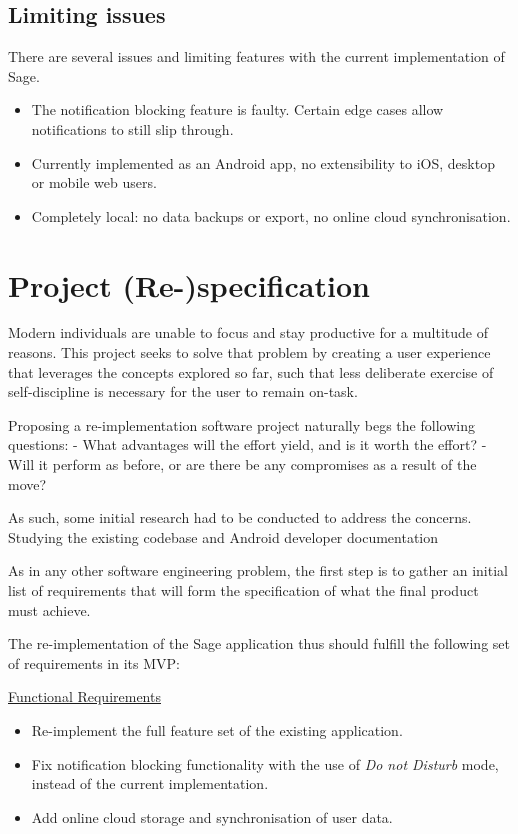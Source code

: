 \subsection{Limiting issues}
There are several issues and limiting features with the current implementation of Sage.

\begin{itemize}
    \item The notification blocking feature is faulty. Certain edge cases allow notifications to still slip through.
    \item Currently implemented as an Android app, no extensibility to iOS, desktop or mobile web users.
    \item Completely local: no data backups or export, no online cloud synchronisation.
\end{itemize}





\section{Project (Re-)specification}
Modern individuals are unable to focus and stay productive for a multitude of reasons. This project seeks to solve that problem by creating a user experience that leverages the concepts explored so far, such that less deliberate exercise of self-discipline is necessary for the user to remain on-task.

Proposing a re-implementation software project naturally begs the following questions:
- What advantages will the effort yield, and is it worth the effort?
- Will it perform as before, or are there be any compromises as a result of the move?

As such, some initial research had to be conducted to address the concerns.
Studying the existing codebase and Android developer documentation

As in any other software engineering problem, the first step is to gather an initial list of requirements that will form the specification of what the final product must achieve.

The re-implementation of the Sage application thus should fulfill the following set of requirements in its MVP:

\underline{Functional Requirements}
\begin{itemize}
    \item Re-implement the full feature set of the existing application.
    \item Fix notification blocking functionality with the use of \textit{Do not Disturb} mode, instead of the current implementation.
    \item Add online cloud storage and synchronisation of user data.
\end{itemize}

